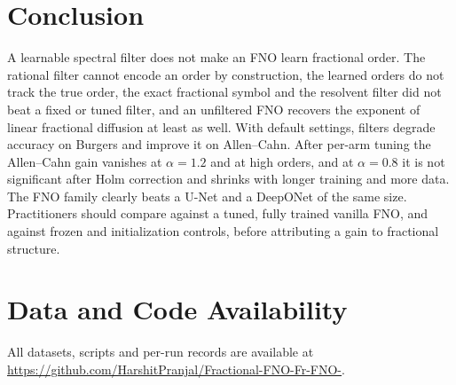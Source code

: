 \documentclass[conference]{IEEEtran}
\begin{document}
\section{Conclusion}
A learnable spectral filter does not make an FNO learn fractional order. The rational filter cannot encode an order by construction, the learned orders do not track the true order, the exact fractional symbol and the resolvent filter did not beat a fixed or tuned filter, and an unfiltered FNO recovers the exponent of linear fractional diffusion at least as well. With default settings, filters degrade accuracy on Burgers and improve it on Allen--Cahn. After per-arm tuning the Allen--Cahn gain vanishes at $\alpha=1.2$ and at high orders, and at $\alpha=0.8$ it is not significant after Holm correction and shrinks with longer training and more data. The FNO family clearly beats a U-Net and a DeepONet of the same size. Practitioners should compare against a tuned, fully trained vanilla FNO, and against frozen and initialization controls, before attributing a gain to fractional structure.

\section*{Data and Code Availability}
All datasets, scripts and per-run records are available at \url{https://github.com/HarshitPranjal/Fractional-FNO-Fr-FNO-}.



\end{document}
